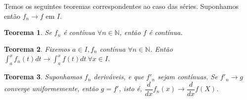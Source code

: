 \documentclass[12pt]{article}
\newtheorem{theorem}{Teorema}[section]
\begin{document}
Temos os seguintes teoremas correspondentes ao caso das séries. Suponhamos então $f_n \rightarrow{}f $ em $I$.

\begin{theorem}
    Se $f_n$ é contínua $\forall n \in \mathbb{N}$, então $f$ é contínua.
\end{theorem}

\begin{theorem}
    Fixemos $a \in I, f_n$ contínua $\forall n \in \mathbb{N}$. Então $\int_a^x f_n(t) d t \rightarrow{} \int_a^x f(t) d t \ \forall x \in I$. 
\end{theorem}

\begin{theorem}
    Suponhamos $f_n$ deriváveis, e que $f'_n$ sejam contínuas. Se $f'_n \rightarrow{} g$ converge uniformemente, então $g = f'$, isto é, $\dfrac{d}{d x} f_n(x) \rightarrow{} \dfrac{d}{d x} f(X)$.
\end{theorem}
\end{document}
